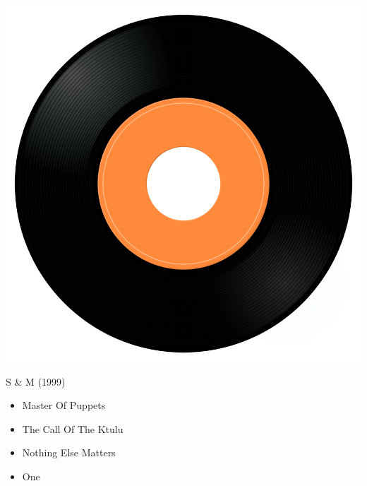 \begin{minipage}[t]{0.25\textwidth}
\captionsetup{type=figure}
\includegraphics[width=\textwidth]{Images/cover.png}
\caption*{S \& M (1999)}
\end{minipage}
\begin{minipage}[t]{0.25\textwidth}\vspace{0pt}
\begin{itemize}[nosep,leftmargin=1em,labelwidth=*,align=left]
	\setlength{\itemsep}{0pt}
	\item Master Of Puppets
	\item The Call Of The Ktulu
	\item Nothing Else Matters
	\item One
\end{itemize}
\end{minipage}
